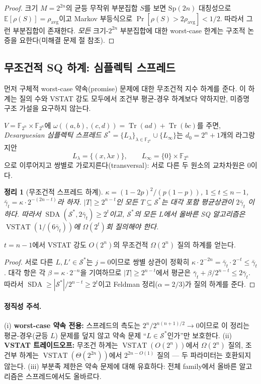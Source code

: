 \documentclass[11pt,a4paper]{article}
\theoremstyle{plain}
\newtheorem{theorem}{정리}[section]
\theoremstyle{definition}
\newcommand{\F}{\mathbb{F}}
\newcommand{\E}{\mathbb{E}}
\DeclareMathOperator{\SDA}{SDA}
\DeclareMathOperator{\VSTAT}{VSTAT}
\begin{document}
\begin{proof}
크기 $M = 2^{2n}$의 균등 무작위 부분집합 $S$를 보면 $\mathrm{Sp}(2n)$ 대칭성으로 $\E[\rho(S)] = \rho_{\mathrm{avg}}$이고 Markov 부등식으로 $\Pr[\rho(S) > 2\rho_{\mathrm{avg}}] < 1/2$. 따라서 그런 부분집합이 존재한다. \emph{모든} 크기-$2^{2n}$ 부분집합에 대한 worst-case 한계는 구조적 논증을 요한다(미해결 문제 절 참조).
\end{proof}

\subsection{무조건적 SQ 하계: 심플렉틱 스프레드}

먼저 구체적 worst-case 약속(promise) 문제에 대한 무조건적 지수 하계를 준다. 이 하계는 질의 수와 VSTAT 강도 모두에서 조건부 평균-경우 하계보다 약하지만, 미증명 구조 가설을 요구하지 않는다.

$V = \F_{2^n}\times\F_{2^n}$에 $\omega((a,b),(c,d)) = \operatorname{Tr}(ad)+\operatorname{Tr}(bc)$를 주면, \emph{Desarguesian 심플렉틱 스프레드} $\mathcal{S}^* = \{L_\lambda\}_{\lambda\in\F_{2^n}}\cup\{L_\infty\}$는 $d_0 = 2^n+1$개의 라그랑지안
\[
L_\lambda = \{(x, \lambda x)\}, \qquad L_\infty = \{0\}\times\F_{2^n}
\]
으로 이루어지고 쌍별로 가로지른다(transversal): 서로 다른 두 원소의 교차차원은 $0$이다.

\begin{theorem}[무조건적 스프레드 하계]
$\kappa = (1-2p)^2/(p(1-p))$, $1 \le t \le n-1$, $\bar\gamma_t = \kappa\cdot 2^{-(2n-t)}$라 하자. $|T| \ge 2^{n-t}$인 모든 $T \subseteq \mathcal{S}^*$는 대각 포함 평균상관이 $2\bar\gamma_t$ 이하다. 따라서 $\SDA(\mathcal{S}^*, 2\bar\gamma_t) \ge 2^t$이고, $\mathcal{S}^*$의 모든 $L$에서 올바른 SQ 알고리즘은 $\VSTAT(1/(6\bar\gamma_t))$에 $\Omega(2^t)$회 질의해야 한다.
\end{theorem}

$t = n-1$에서 VSTAT 강도 $O(2^n)$의 무조건적 $\Omega(2^n)$ 질의 하계를 얻는다.

\begin{proof}
서로 다른 $L, L' \in \mathcal{S}^*$는 $j=0$이므로 쌍별 상관이 정확히 $\kappa\cdot 2^{-2n} = \bar\gamma_t\cdot 2^{-t} \le \bar\gamma_t$. 대각 항은 각 $\beta = \kappa\cdot 2^{-n}$을 기여하므로 $|T| \ge 2^{n-t}$에서 평균은 $\bar\gamma_t + \beta/2^{n-t} \le 2\bar\gamma_t$. 따라서 $\SDA \ge |\mathcal{S}^*|/2^{n-t} \ge 2^t$이고 Feldman 정리($\alpha = 2/3$)가 질의 하계를 준다.
\end{proof}

\paragraph{정직성 주석.} (i) \textbf{worst-case 약속 전용:} 스프레드의 측도는 $2^n/2^{n(n+1)/2} \to 0$이므로 이 정리는 평균-경우(균등 $L$) 문제를 덮지 않고 약속 문제 ``$L \in \mathcal{S}^*$인가''만 보호한다. (ii) \textbf{VSTAT 트레이드오프:} 무조건 하계는 $\VSTAT(O(2^n))$에서 $\Omega(2^n)$ 질의, 조건부 하계는 $\VSTAT(\Theta(2^{2n}))$에서 $2^{2n-O(1)}$ 질의 --- 두 파라미터는 호환되지 않는다. (iii) 부분족 제한은 약속 문제에 대해 유효하다: 전체 family에서 올바른 알고리즘은 스프레드에서도 올바르다.
\end{document}
